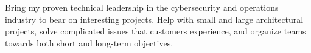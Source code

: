 

\begin{cvparagraph}

Bring my proven technical leadership in the cybersecurity and operations industry to bear on interesting projects. Help with small and large architectural projects, solve complicated issues that customers experience, and organize teams towards both short and long-term objectives. 
\end{cvparagraph}
